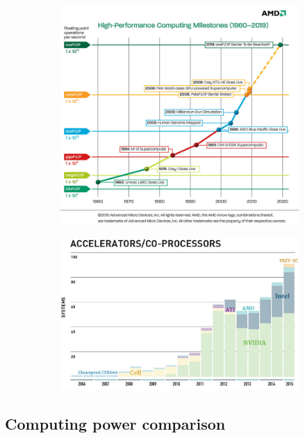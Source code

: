\begin{figure}[ht]
\centering
\begin{subfigure}{.5\textwidth}
	\centering
	\includegraphics[width=.9\linewidth]{figure_parallel/metrics.png}
\end{subfigure}%
\begin{subfigure}{.5\textwidth}
	\centering
	\includegraphics[width=.9\linewidth]{figure_parallel/metrics2.png}
\end{subfigure}
\end{figure}
\FloatBarrier







\subsection{Computing power comparison}

